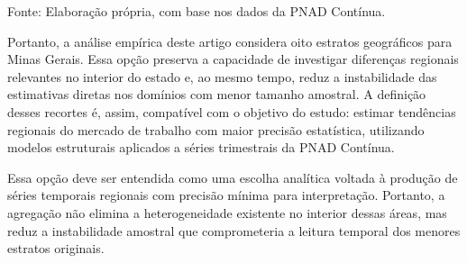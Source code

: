 \documentclass[rbe,wwwview]{econbr}
\renewcommand{\fonte}[1]{
    \begin{center}
    \footnotesize
    Fonte: #1
    \end{center}
}
\begin{document}
\vspace{-1em}
\begin{table}[H]
    \centering
    \captionsetup{justification=centering}
    \caption{Média do coeficiente de variação para os oito estratos geográficos de Minas Gerais -- 1º trimestre de 2012 ao 4º trimestre de 2024}
    \renewcommand{\arraystretch}{0.8}
    \fonte{Elaboração própria, com base nos dados da PNAD Contínua.}
    \label{tab:cvmedest}
\end{table}
\vspace{-1em}

Portanto, a análise empírica deste artigo considera oito estratos geográficos para Minas Gerais. Essa opção preserva a capacidade de investigar diferenças regionais relevantes no interior do estado e, ao mesmo tempo, reduz a instabilidade das estimativas diretas nos domínios com menor tamanho amostral. A definição desses recortes é, assim, compatível com o objetivo do estudo: estimar tendências regionais do mercado de trabalho com maior precisão estatística, utilizando modelos estruturais aplicados a séries trimestrais da PNAD Contínua.

Essa opção deve ser entendida como uma escolha analítica voltada à produção de séries temporais regionais com precisão mínima para interpretação. Portanto, a agregação não elimina a heterogeneidade existente no interior dessas áreas, mas reduz a instabilidade amostral que comprometeria a leitura temporal dos menores estratos originais.
\end{document}
